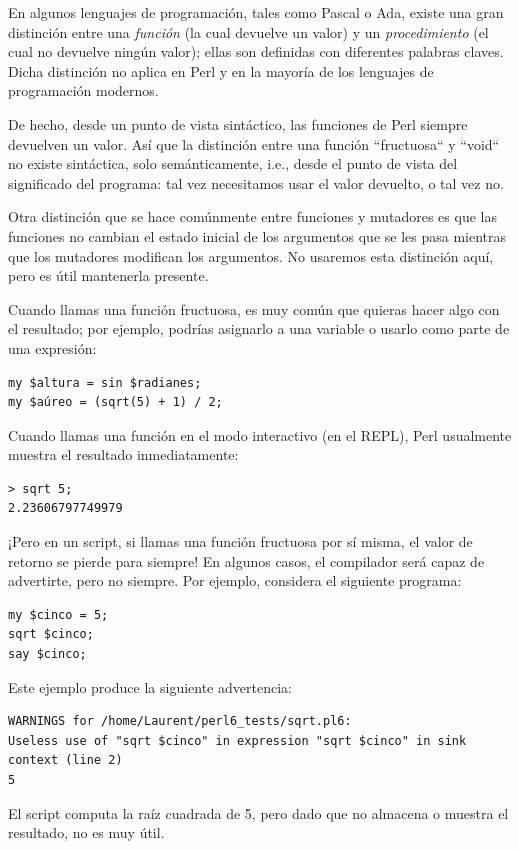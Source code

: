 En algunos lenguajes de programación, tales como Pascal o Ada,
existe una gran distinción entre una \emph{función} (la cual
devuelve un valor) y un \emph{procedimiento} (el cual no devuelve
ningún valor); ellas son definidas con diferentes palabras claves.
Dicha distinción no aplica en Perl y en la mayoría de los 
lenguajes de programación modernos.

De hecho, desde un punto de vista sintáctico, las funciones de Perl
siempre devuelven un valor. Así que la distinción entre una función
``fructuosa`` y ``void`` no existe sintáctica, solo semánticamente, i.e.,
desde el punto de vista del significado del programa: tal vez necesitamos
usar el valor devuelto, o tal vez no.

Otra distinción que se hace comúnmente entre funciones y mutadores es
que las funciones no cambian el estado inicial de los argumentos 
que se les pasa mientras que los mutadores modifican los argumentos. 
No usaremos esta distinción aquí, pero es útil mantenerla presente.

Cuando llamas una función fructuosa, es muy común que quieras
hacer algo con el resultado; por ejemplo, podrías asignarlo a una
variable o usarlo como parte de una expresión:
 
\begin{verbatim}
my $altura = sin $radianes;
my $aúreo = (sqrt(5) + 1) / 2;
\end{verbatim}
%
Cuando llamas una función en el modo interactivo (en
el REPL), Perl usualmente muestra el resultado inmediatamente:

\begin{verbatim}
> sqrt 5;
2.23606797749979
\end{verbatim}
%
¡Pero en un script, si llamas una función fructuosa por sí misma,
el valor de retorno se pierde para siempre! En algunos casos, el 
compilador será capaz de advertirte, pero no siempre. Por ejemplo,
considera el siguiente programa:

\begin{verbatim}
my $cinco = 5;
sqrt $cinco;
say $cinco;
\end{verbatim}

Este ejemplo produce la siguiente advertencia:

\begin{verbatim}
WARNINGS for /home/Laurent/perl6_tests/sqrt.pl6:
Useless use of "sqrt $cinco" in expression "sqrt $cinco" in sink context (line 2)
5
\end{verbatim}
%
El script computa la raíz cuadrada de 5, pero 
dado que no almacena o muestra el resultado, no es muy útil.

